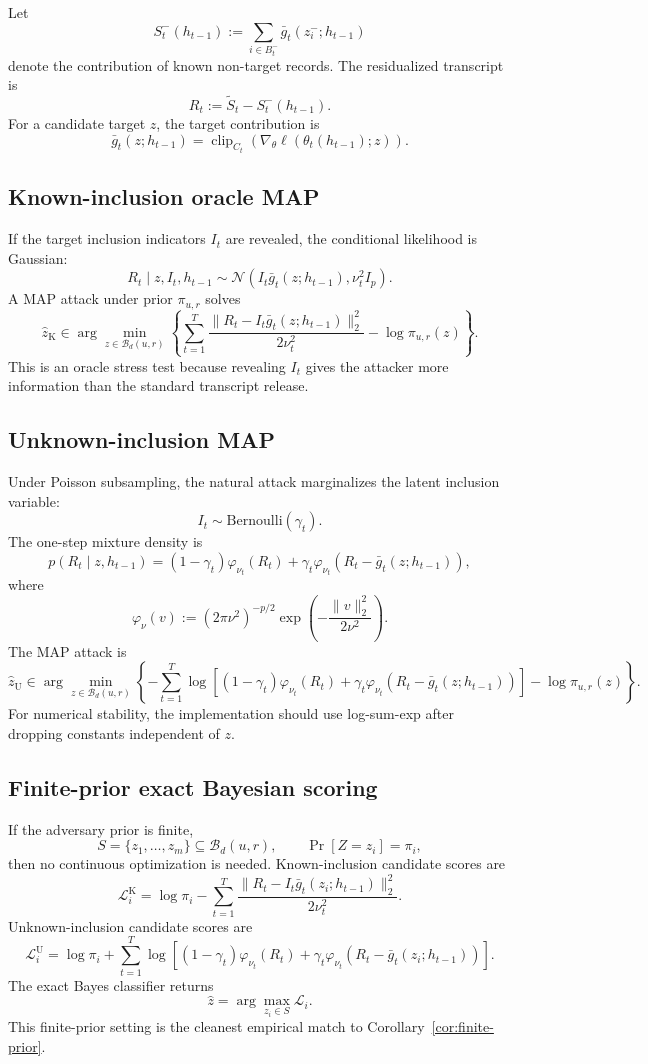 \documentclass[conference,compsoc]{IEEEtran}
\DeclareMathOperator{\clip}{clip}
\newcommand{\N}{\mathcal{N}}
\newcommand{\cB}{\mathcal{B}}
\begin{document}
Let
\[
S_t^-(h_{t-1})
:=
\sum_{i\in B_t^-}\bar g_t(z_i^-;h_{t-1})
\]
denote the contribution of known non-target records. The residualized transcript is
\[
R_t:=\widetilde S_t-S_t^-(h_{t-1}).
\]
For a candidate target $z$, the target contribution is
\[
\bar g_t(z;h_{t-1})=
\clip_{C_t}(\nabla_\theta\ell(\theta_t(h_{t-1});z)).
\]

\subsection{Known-inclusion oracle MAP}

If the target inclusion indicators $I_t$ are revealed, the conditional likelihood is Gaussian:
\[
R_t\mid z,I_t,h_{t-1}
\sim
\N(I_t\bar g_t(z;h_{t-1}),\nu_t^2 I_p).
\]
A MAP attack under prior $\pi_{u,r}$ solves
\[
\widehat z_{\mathrm K}
\in
\arg\min_{z\in\cB_d(u,r)}
\left\{
\sum_{t=1}^T
\frac{\|R_t-I_t\bar g_t(z;h_{t-1})\|_2^2}{2\nu_t^2}
-
\log\pi_{u,r}(z)
\right\}.
\]
This is an oracle stress test because revealing $I_t$ gives the attacker more information than the standard transcript release.

\subsection{Unknown-inclusion MAP}

Under Poisson subsampling, the natural attack marginalizes the latent inclusion variable:
\[
I_t\sim\mathrm{Bernoulli}(\gamma_t).
\]
The one-step mixture density is
\[
p(R_t\mid z,h_{t-1})
=(1-\gamma_t)\varphi_{\nu_t}(R_t)
+\gamma_t\varphi_{\nu_t}(R_t-\bar g_t(z;h_{t-1})),
\]
where
\[
\varphi_\nu(v):=(2\pi\nu^2)^{-p/2}\exp\left(-\frac{\|v\|_2^2}{2\nu^2}\right).
\]
The MAP attack is
\[
\widehat z_{\mathrm U}
\in
\arg\min_{z\in\cB_d(u,r)}
\left\{
-
\sum_{t=1}^T
\log\left[(1-\gamma_t)\varphi_{\nu_t}(R_t)+\gamma_t\varphi_{\nu_t}(R_t-\bar g_t(z;h_{t-1}))\right]
-
\log\pi_{u,r}(z)
\right\}.
\]
For numerical stability, the implementation should use log-sum-exp after dropping constants independent of $z$.

\subsection{Finite-prior exact Bayesian scoring}

If the adversary prior is finite,
\[
S=\{z_1,\ldots,z_m\}\subseteq\cB_d(u,r),
\qquad
\Pr[Z=z_i]=\pi_i,
\]
then no continuous optimization is needed. Known-inclusion candidate scores are
\[
\mathcal L_i^{\mathrm K}
=
\log\pi_i
-
\sum_{t=1}^T
\frac{\|R_t-I_t\bar g_t(z_i;h_{t-1})\|_2^2}{2\nu_t^2}.
\]
Unknown-inclusion candidate scores are
\[
\mathcal L_i^{\mathrm U}
=
\log\pi_i
+
\sum_{t=1}^T
\log\left[(1-\gamma_t)\varphi_{\nu_t}(R_t)+\gamma_t\varphi_{\nu_t}(R_t-\bar g_t(z_i;h_{t-1}))\right].
\]
The exact Bayes classifier returns
\[
\widehat z=\arg\max_{z_i\in S}\mathcal L_i.
\]
This finite-prior setting is the cleanest empirical match to Corollary~\ref{cor:finite-prior}.
\end{document}
